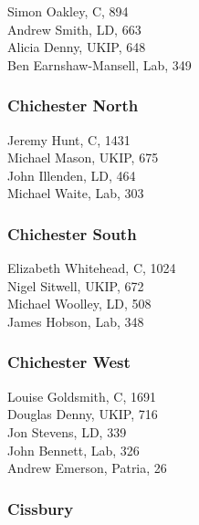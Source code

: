 \documentclass[a4paper,openany,10pt]{book}
\begin{document}


Simon Oakley, C, 894\\
Andrew Smith, LD, 663\\
Alicia Denny, UKIP, 648\\
Ben Earnshaw-Mansell, Lab, 349\\


\subsubsection*{Chichester North}



Jeremy Hunt, C, 1431\\
Michael Mason, UKIP, 675\\
John Illenden, LD, 464\\
Michael Waite, Lab, 303\\


\subsubsection*{Chichester South}



Elizabeth Whitehead, C, 1024\\
Nigel Sitwell, UKIP, 672\\
Michael Woolley, LD, 508\\
James Hobson, Lab, 348\\


\subsubsection*{Chichester West}



Louise Goldsmith, C, 1691\\
Douglas Denny, UKIP, 716\\
Jon Stevens, LD, 339\\
John Bennett, Lab, 326\\
Andrew Emerson, Patria, 26\\


\subsubsection*{Cissbury}
\end{document}

